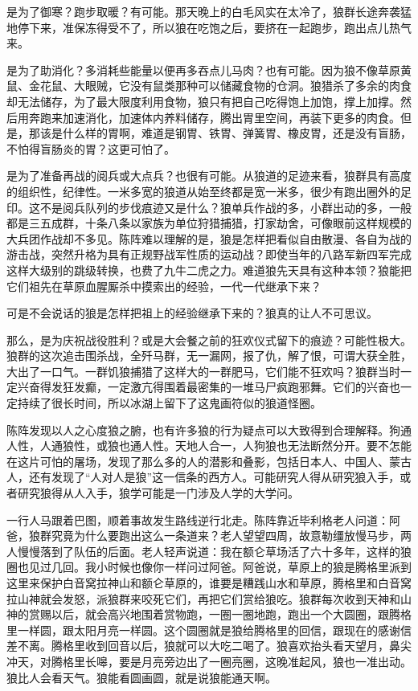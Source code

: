 \par 是为了御寒？跑步取暖？有可能。那天晚上的白毛风实在太冷了，狼群长途奔袭猛地停下来，准保冻得受不了，所以狼在吃饱之后，要挤在一起跑步，跑出点儿热气来。
\par 是为了助消化？多消耗些能量以便再多吞点儿马肉？也有可能。因为狼不像草原黄鼠、金花鼠、大眼贼，它没有鼠类那种可以储藏食物的仓洞。狼猎杀了多余的肉食却无法储存，为了最大限度利用食物，狼只有把自己吃得饱上加饱，撑上加撑。然后用奔跑来加速消化，加速体内养料储存，腾出胃里空间，再装下更多的肉食。但是，那该是什么样的胃啊，难道是钢胃、铁胃、弹簧胃、橡皮胃，还是没有盲肠，不怕得盲肠炎的胃？这更可怕了。
\par 是为了准备再战的阅兵或大点兵？也很有可能。从狼道的足迹来看，狼群具有高度的组织性，纪律性。一米多宽的狼道从始至终都是宽一米多，很少有跑出圈外的足印。这不是阅兵队列的步伐痕迹又是什么？狼单兵作战的多，小群出动的多，一般都是三五成群，十条八条以家族为单位狩猎捕猎，打家劫舍，可像眼前这样规模的大兵团作战却不多见。陈阵难以理解的是，狼是怎样把看似自由散漫、各自为战的游击战，突然升格为具有正规野战军性质的运动战？即使当年的八路军新四军完成这样大级别的跳级转换，也费了九牛二虎之力。难道狼先天具有这种本领？狼能把它们祖先在草原血腥厮杀中摸索出的经验，一代一代继承下来？
\par 可是不会说话的狼是怎样把祖上的经验继承下来的？狼真的让人不可思议。
\par 那么，是为庆祝战役胜利？或是大会餐之前的狂欢仪式留下的痕迹？可能性极大。狼群的这次追击围杀战，全歼马群，无一漏网，报了仇，解了恨，可谓大获全胜，大出了一口气。一群饥狼捕猎了这样大的一群肥马，它们能不狂欢吗？狼群当时一定兴奋得发狂发癫，一定激亢得围着最密集的一堆马尸疯跑邪舞。它们的兴奋也一定持续了很长时间，所以冰湖上留下了这鬼画符似的狼道怪圈。
\par 陈阵发现以人之心度狼之腑，也有许多狼的行为疑点可以大致得到合理解释。狗通人性，人通狼性，或狼也通人性。天地人合一，人狗狼也无法断然分开。要不怎能在这片可怕的屠场，发现了那么多的人的潜影和叠影，包括日本人、中国人、蒙古人，还有发现了“人对人是狼”这一信条的西方人。可能研究人得从研究狼入手，或者研究狼得从人入手，狼学可能是一门涉及人学的大学问。
\par 一行人马跟着巴图，顺着事故发生路线逆行北走。陈阵靠近毕利格老人问道：阿爸，狼群究竟为什么要跑出这么一条道来？老人望望四周，故意勒缰放慢马步，两人慢慢落到了队伍的后面。老人轻声说道：我在额仑草场活了六十多年，这样的狼圈也见过几回。我小时候也像你一样问过阿爸。阿爸说，草原上的狼是腾格里派到这里来保护白音窝拉神山和额仑草原的，谁要是糟践山水和草原，腾格里和白音窝拉山神就会发怒，派狼群来咬死它们，再把它们赏给狼吃。狼群每次收到天神和山神的赏赐以后，就会高兴地围着赏物跑，一圈一圈地跑，跑出一个大圆圈，跟腾格里一样圆，跟太阳月亮一样圆。这个圆圈就是狼给腾格里的回信，跟现在的感谢信差不离。腾格里收到回音以后，狼就可以大吃二喝了。狼喜欢抬头看天望月，鼻尖冲天，对腾格里长嗥，要是月亮旁边出了一圈亮圈，这晚准起风，狼也一准出动。狼比人会看天气。狼能看圆画圆，就是说狼能通天啊。

